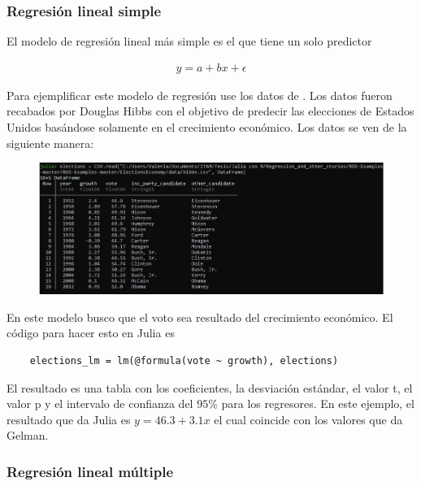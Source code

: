 \subsubsection{Regresión lineal simple}
El modelo de regresión lineal más simple es el que tiene un solo predictor

\begin{equation*}
    \begin{aligned}
    y = a + bx + \epsilon
    \end{aligned}
\end{equation*}

Para ejemplificar este modelo de regresión use los datos de \citep{regression_other_stories}. Los datos fueron recabados por Douglas Hibbs con el objetivo de predecir las elecciones de Estados Unidos basándose solamente en el crecimiento económico. Los datos se ven de la siguiente manera: 

\begin{figure}[H]
\begin{center}
\includegraphics[scale=0.5]{Imagenes/elections_dataframe.JPG}
  \label{elections_dataframe}
\end{center}
\end{figure}

En este modelo busco que el voto sea resultado del crecimiento económico. El código para hacer esto en Julia es

\begin{verbatim}
	elections_lm = lm(@formula(vote ~ growth), elections)
\end{verbatim}

El resultado es una tabla con los coeficientes, la desviación estándar, el valor t, el valor p y el intervalo de confianza del $95 \% $ para los regresores. En este ejemplo, el resultado que da Julia es $y = 46.3 + 3.1x$ el cual coincide con los valores que da Gelman.

\subsubsection{Regresión lineal múltiple}

